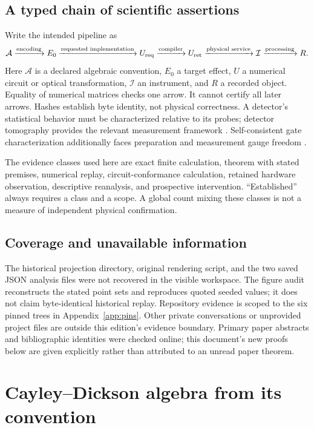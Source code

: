 \documentclass[11pt,a4paper]{article}
\begin{document}
\subsection{A typed chain of scientific assertions}
Write the intended pipeline as
\begin{equation}
\mathcal A \xrightarrow{\text{encoding}} E_0
\xrightarrow{\text{requested implementation}} U_{\rm req}
\xrightarrow{\text{compiler}} U_{\rm ret}
\xrightarrow{\text{physical service}} \mathcal I
\xrightarrow{\text{processing}} R.
\end{equation}
Here $\mathcal A$ is a declared algebraic convention, $E_0$ a target effect, $U$ a numerical circuit or optical transformation, $\mathcal I$ an instrument, and $R$ a recorded object. Equality of numerical matrices checks one arrow. It cannot certify all later arrows. Hashes establish byte identity, not physical correctness. A detector's statistical behavior must be characterized relative to its probes; detector tomography provides the relevant measurement framework \cite{lundeen}. Self-consistent gate characterization additionally faces preparation and measurement gauge freedom \cite{gst}.

The evidence classes used here are exact finite calculation, theorem with stated premises, numerical replay, circuit-conformance calculation, retained hardware observation, descriptive reanalysis, and prospective intervention. ``Established'' always requires a class and a scope. A global count mixing these classes is not a measure of independent physical confirmation.

\subsection{Coverage and unavailable information}
The historical projection directory, original rendering script, and the two saved JSON analysis files were not recovered in the visible workspace. The figure audit reconstructs the stated point sets and reproduces quoted seeded values; it does not claim byte-identical historical replay. Repository evidence is scoped to the six pinned trees in Appendix~\ref{app:pins}. Other private conversations or unprovided project files are outside this edition's evidence boundary. Primary paper abstracts and bibliographic identities were checked online; this document's new proofs below are given explicitly rather than attributed to an unread paper theorem.

\section{Cayley--Dickson algebra from its convention}
\end{document}
